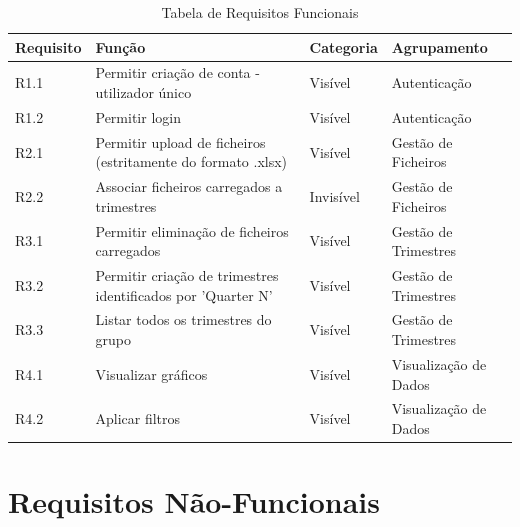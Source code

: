 \begin{table}[h!]
\centering
\begin{tabular}{|l|p{7cm}|l|l|}
\hline
\textbf{Requisito} & \textbf{Função} & \textbf{Categoria} & \textbf{Agrupamento} \\
\hline
R1.1 & Permitir criação de conta - utilizador único & Visível & Autenticação \\
R1.2 & Permitir login & Visível & Autenticação \\
R2.1 & Permitir upload de ficheiros (estritamente do formato .xlsx) & Visível & Gestão de Ficheiros \\
R2.2 & Associar ficheiros carregados a trimestres & Invisível & Gestão de Ficheiros \\
R3.1 & Permitir eliminação de ficheiros carregados & Visível & Gestão de Trimestres \\
R3.2 & Permitir criação de trimestres identificados por 'Quarter N' & Visível & Gestão de Trimestres \\
R3.3 & Listar todos os trimestres do grupo & Visível & Gestão de Trimestres \\
R4.1 & Visualizar gráficos & Visível & Visualização de Dados \\
R4.2 & Aplicar filtros & Visível & Visualização de Dados \\
\hline
\end{tabular}
\caption{Tabela de Requisitos Funcionais}
\label{tab:requisitosFuncionais}
\end{table}

\section{Requisitos Não-Funcionais}

